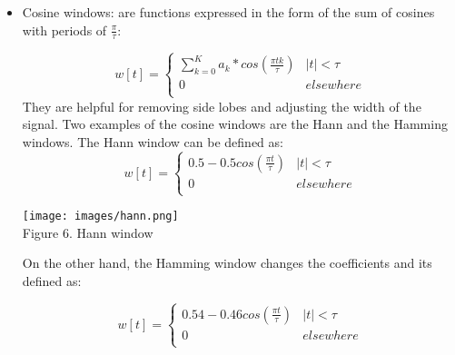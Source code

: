 {{{{{\begin{itemize}
         \begin{equation*}
          w[t]=
        \begin{cases}
          1 - \frac{|t|}{\tau}  &|t| < \tau \\
          0  &elsewhere \\
        \end{cases}
      \end{equation*}
  
 
         \begin{center}
         \texttt{[image: images/triangular.png]} \\
         Figure 5. Triangular window
         \end{center}

     \item Cosine windows: are functions expressed in the form of the sum of cosines
     with periods of $\frac{\pi}{\tau} $:


     \begin{equation*}
          w[t]=
        \begin{cases}
          \sum_{k=0}^{K} a_k*cos(\frac{\pi t k}{\tau})  &|t| < \tau \\
          0  &elsewhere \\
        \end{cases}
      \end{equation*}
    They are helpful for removing side lobes and adjusting the width of the signal. Two examples of the cosine windows are  the Hann and the Hamming windows. The Hann window can be defined as:
     \begin{equation*}
          w[t]=
        \begin{cases}
          0.5 - 0.5cos(\frac{\pi t}{\tau})  &|t| < \tau \\
          0  &elsewhere \\
        \end{cases}
      \end{equation*}


       \begin{center}
         \texttt{[image: images/hann.png]} \\
         Figure 6. Hann window
         \end{center}


    On the other hand, the Hamming window changes the coefficients and its defined as:

    \begin{equation*}
          w[t]=
        \begin{cases}
          0.54 - 0.46cos(\frac{\pi t}{\tau})  &|t| < \tau \\
          0  &elsewhere \\
        \end{cases}
      \end{equation*}


\end{itemize}}}}}}
